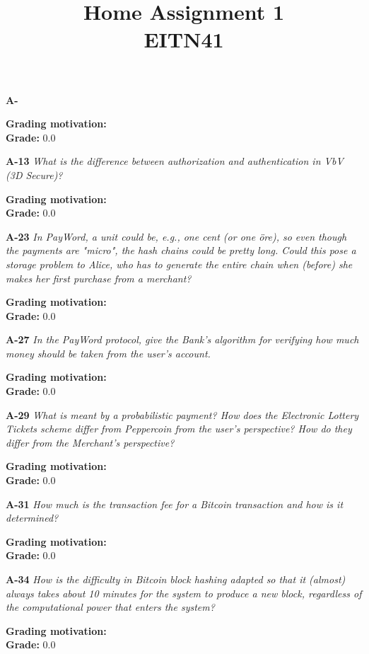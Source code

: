 \documentclass[a4paper]{article}
\title{Home Assignment 1 \\ EITN41}
\author{}
\date{}
\newcommand{\Q}[2]{
  \textbf{#1} \textit{#2}
 }
\newcommand{\A}[1]{ #1 }
\newcommand{\Grade}[2]{ 
  \textbf{Grading motivation:} #2 \\ 
  \hspace*{\fill} \textbf{Grade:} #1 
}
\begin{document}
\maketitle

\Q{A-} {}

\A{
}

\Grade{0.0}{}

\Q{A-13} {What is the difference between \textup{authorization} and 
\textup{authentication} in VbV (3D Secure)?}

\A{
}

\Grade{0.0}{}

\Q{A-23} {In  PayWord,  a  unit  could  be,  e.g.,  one  cent  (or  one  {\"o}re),  
so  even  though  the  payments  are  "micro", the hash chains could be pretty long.  
Could this pose a storage problem to Alice, who has to generate the entire chain when 
(before) she makes her  first purchase from a merchant?}

\A{
}

\Grade{0.0}{}

\Q{A-27} {In the PayWord protocol, give the Bank's algorithm for verifying how much money 
should be taken from the user's account.}

\A{
}

\Grade{0.0}{}

\Q{A-29} {What  is  meant  by  a  probabilistic  payment?   How  does  the  
Electronic  Lottery  Tickets  scheme  differ from Peppercoin from the user's perspective?
How do they differ from the Merchant's perspective?}

\A{
}

\Grade{0.0}{}

\Q{A-31} {How much is the transaction fee for a Bitcoin transaction and how is it 
determined?}

\A{
}

\Grade{0.0}{}

\Q{A-34} {How  is  the  difficulty  in  Bitcoin  block  hashing  adapted  so  that  it  
(almost)  always  takes  about  10 minutes for the system to produce a new block, 
regardless of the computational power that enters the system?}

\A{
}

\Grade{0.0}{}
\end{document}
